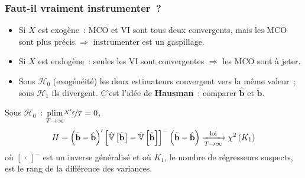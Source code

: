 \documentclass[10pt]{beamer}
\begin{document}
\begin{frame}
  \frametitle{Faut-il vraiment instrumenter~?}

  \begin{itemize}

  \item Si $X$ est exogène~: MCO et VI sont tous deux convergents, mais les MCO
    sont plus précis $\Rightarrow$ instrumenter est un gaspillage.\newline

  \item Si $X$ est endogène~: seules les VI sont convergentes $\Rightarrow$ les
    MCO sont à jeter.\newline

  \item[$\Rightarrow$] Sous $\mathcal H_0$ (exogénéité) les deux estimateurs
    convergent vers la même valeur~; sous $\mathcal H_1$ ils divergent. C'est
    l'idée de \textbf{Hausman}~: comparer $\hat{\mathbf b}$ et
    $\tilde{\mathbf b}$.

  \end{itemize}

  \medskip

  \begin{theorem}\label{thm:hausman}
    Sous $\mathcal H_0$~: $\underset{T\rightarrow\infty}{\text{plim}}\nicefrac{X'\varepsilon}{T} = 0$,
    \[
      H = \left(\tilde{\mathbf b}-\hat{\mathbf b}\right)'\left[ \hat{\mathbb V}\left[\tilde{\mathbf b}\right]-\hat{\mathbb V}\left[\hat{\mathbf b}\right] \right]^{-}\left(\tilde{\mathbf b}-\hat{\mathbf b}\right) \xrightarrow[T\rightarrow\infty]{\text{loi}} \chi^2\left( K_1 \right)
    \]
    où $\left[\,\cdot\,\right]^{-}$ est un inverse généralisé et où $K_1$, le
    nombre de régresseurs suspects, est le rang de la différence des variances.
  \end{theorem}

\end{frame}
\end{document}

